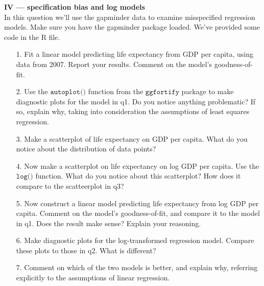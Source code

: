 \documentclass[10pt]{extarticle}
\begin{document}
\hfill 

{\Large \bf IV --- specification bias and log models}  \\

In this question we'll use the gapminder data to examine misspecified regression models. Make sure you have the gapminder package loaded. We've provided some code in the R file. \\ 

\begin{itemize}
		
	\item[1.] Fit a linear model predicting life expectancy from GDP per capita, using data from 2007. Report your results. Comment on the model's goodness-of-fit. \\ 
	
	\item[2.] Use the $\texttt{autoplot()}$ function from the $\texttt{ggfortify}$ package to make diagnostic plots for the model in q1. Do you notice anything problematic? If so, explain why, taking into consideration the assumptions of least squares regression. \\ 
	
	\item[3.] Make a scatterplot of life expectancy on GDP per capita. What do you notice about the distribution of data points? \\ 
	
    \item[4.] Now make a scatterplot on life expectancy on log GDP per capita. Use the $\texttt{log()}$ function. What do you notice about this scatterplot? How does it compare to the scatteerplot in q3? \\ 
    
    \item[5.] Now construct a linear model predicting life expectancy from log GDP per capita. Comment on the model's goodness-of-fit, and compare it to the model in q1. Does the result make sense? Explain your reasoning. \\ 
    
    \item[6.] Make diagnostic plots for the log-transformed regression model. Compare these plots to those in q2. What is different? \\ 
    
    \item[7.] Comment on which of the two models is better, and explain why, referring explicitly to the assumptions of linear regression. 

\end{itemize}
\end{document}
